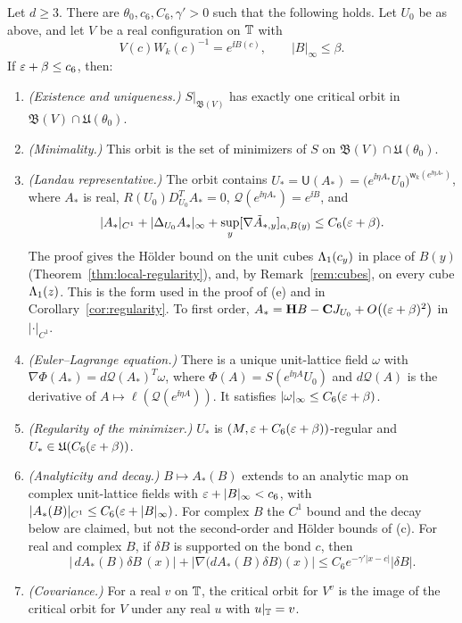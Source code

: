 \begin{theorem}\label{thm:variational}
Let $d\ge3$. There are $\theta_0,c_6,C_6,\gamma'>0$ such that the following holds. Let $U_0$ be as above, and let $V$ be a real configuration on $\mathbb T$ with
\[
V(c)W_k(c)^{-1}=e^{\ii B(c)},\qquad|B|_\infty\le\beta .
\]
If $\varepsilon+\beta\le c_6$, then:
\begin{enumerate}[label=(\alph*)]
\item \emph{(Existence and uniqueness.)} $S|_{\mathfrak B(V)}$ has exactly one critical orbit in $\mathfrak B(V)\cap\mathfrak U(\theta_0)$.
\item \emph{(Minimality.)} This orbit is the set of minimizers of $S$ on $\mathfrak B(V)\cap\mathfrak U(\theta_0)$.
\item \emph{(Landau representative.)} The orbit contains $U_*=\mathsf U(A_*)=\big(e^{\ii\eta A_*}U_0\big)^{\mathsf w_k(e^{\ii\eta A_*})}$, where $A_*$ is real, $R(U_0)D^T_{U_0}A_*=0$, $\mathcal Q(e^{\ii\eta A_*})=e^{\ii B}$, and
\[
|A_*|_{C^1}+|\Delta_{U_0}A_*|_\infty+\sup_y[\nabla\tilde A_{*,y}]_{\alpha,B(y)}\le C_6(\varepsilon+\beta).
\]
The proof gives the H\"older bound on the unit cubes $\Lambda_1(c_y)$ in place of $B(y)$ (Theorem~\ref{thm:local-regularity}), and, by Remark~\ref{rem:cubes}, on every cube $\Lambda_1(z)$. This is the form used in the proof of (e) and in Corollary~\ref{cor:regularity}.
To first order, $A_*=\mathbf H B-\mathbf C J_{U_0}+O\big((\varepsilon+\beta)^2\big)$ in $|\cdot|_{C^1}$.
\item \emph{(Euler--Lagrange equation.)} There is a unique unit-lattice field $\omega$ with $\nabla\Phi(A_*)=d\mathcal Q(A_*)^T\omega$, where $\Phi(A)=S(e^{\ii\eta A}U_0)$ and $d\mathcal Q(A)$ is the derivative of $A\mapsto\ell(\mathcal Q(e^{\ii\eta A}))$. It satisfies $|\omega|_\infty\le C_6(\varepsilon+\beta)$.
\item \emph{(Regularity of the minimizer.)} $U_*$ is $(M,\varepsilon+C_6(\varepsilon+\beta))$-regular and $U_*\in\mathfrak U(C_6(\varepsilon+\beta))$.
\item \emph{(Analyticity and decay.)} $B\mapsto A_*(B)$ extends to an analytic map on complex unit-lattice fields with $\varepsilon+|B|_\infty<c_6$, with $|A_*(B)|_{C^1}\le C_6(\varepsilon+|B|_\infty)$. For complex $B$ the $C^1$ bound and the decay below are claimed, but not the second-order and H\"older bounds of (c). For real and complex $B$, if $\delta B$ is supported on the bond $c$, then
\[
\big|\,dA_*(B)\delta B\,(x)\big|+\big|\nabla\big(dA_*(B)\delta B\big)(x)\big|\le C_6e^{-\gamma'|x-c|}|\delta B| .
\]
\item \emph{(Covariance.)} For a real $v$ on $\mathbb T$, the critical orbit for $V^v$ is the image of the critical orbit for $V$ under any real $u$ with $u|_\mathbb T=v$.
\end{enumerate}
\end{theorem}


